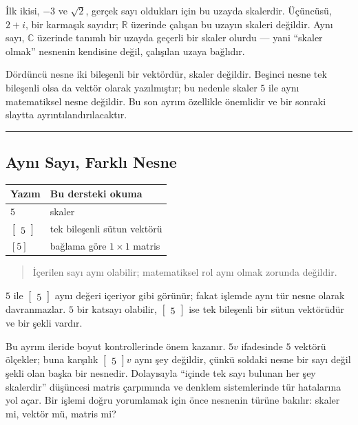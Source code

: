 \documentclass[
  a4paper,
  DIV=11,
  numbers=noendperiod]{scrartcl}
\begin{document}
İlk ikisi, \(-3\) ve \(\sqrt2\), gerçek sayı oldukları için bu uzayda
skalerdir. Üçüncüsü, \(2+i\), bir karmaşık sayıdır; \(\mathbb{R}\)
üzerinde çalışan bu uzayın skaleri değildir. Aynı sayı, \(\mathbb{C}\)
üzerinde tanımlı bir uzayda geçerli bir skaler olurdu --- yani ``skaler
olmak'' nesnenin kendisine değil, çalışılan uzaya bağlıdır.

Dördüncü nesne iki bileşenli bir vektördür, skaler değildir. Beşinci
nesne tek bileşenli olsa da vektör olarak yazılmıştır; bu nedenle skaler
\(5\) ile aynı matematiksel nesne değildir. Bu son ayrım özellikle
önemlidir ve bir sonraki slaytta ayrıntılandırılacaktır.

\begin{center}\rule{0.5\linewidth}{0.5pt}\end{center}

\subsection{Aynı Sayı, Farklı
Nesne}\label{aynux131-sayux131-farklux131-nesne}

\begin{longtable}[]{@{}ll@{}}
\toprule\noalign{}
Yazım & Bu dersteki okuma \\
\midrule\noalign{}
\endhead
\bottomrule\noalign{}
\endlastfoot
\(5\) & skaler \\
\(\begin{bmatrix}5\end{bmatrix}\) & tek bileşenli sütun vektörü \\
\([5]\) & bağlama göre \(1\times1\) matris \\
\end{longtable}

\begin{quote}
İçerilen sayı aynı olabilir; matematiksel rol aynı olmak zorunda
değildir.
\end{quote}

\(5\) ile \(\begin{bmatrix}5\end{bmatrix}\) aynı değeri içeriyor gibi
görünür; fakat işlemde aynı tür nesne olarak davranmazlar. \(5\) bir
katsayı olabilir, \(\begin{bmatrix}5\end{bmatrix}\) ise tek bileşenli
bir sütun vektörüdür ve bir şekli vardır.

Bu ayrım ileride boyut kontrollerinde önem kazanır. \(5v\) ifadesinde
\(5\) vektörü ölçekler; buna karşılık \(\begin{bmatrix}5\end{bmatrix}v\)
aynı şey değildir, çünkü soldaki nesne bir sayı değil şekli olan başka
bir nesnedir. Dolayısıyla ``içinde tek sayı bulunan her şey skalerdir''
düşüncesi matris çarpımında ve denklem sistemlerinde tür hatalarına yol
açar. Bir işlemi doğru yorumlamak için önce nesnenin türüne bakılır:
skaler mi, vektör mü, matris mi?
\end{document}
